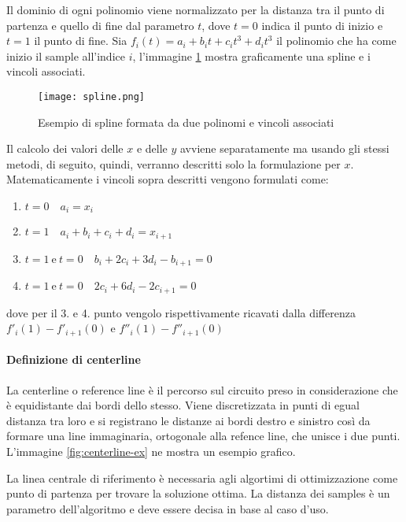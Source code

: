 Il dominio di ogni polinomio viene normalizzato per la distanza tra il punto di partenza e quello di fine
dal parametro $t$, dove $t = 0$ indica il punto di inizio e $t = 1$ il punto di fine.
Sia $f_i(t) = a_i + b_i t + c_i t^3 + d_i t^3$ il polinomio che ha come inizio il sample all'indice $i$,
l'immagine \ref{fig:spline} mostra graficamente una spline e i vincoli associati.

\begin{figure}
	\begin{center}
		\texttt{[image: spline.png]}
	\end{center}
	\caption{Esempio di spline formata da due polinomi e vincoli associati \cite{lection22}}
	\label{fig:spline}
\end{figure}

Il calcolo dei valori delle $x$ e delle $y$ avviene separatamente ma usando gli stessi metodi, di
seguito, quindi, verranno descritti solo la formulazione per $x$.
Matematicamente i vincoli sopra descritti vengono formulati come:
\begin{enumerate}
	\item $t = 0 \quad a_i = x_i$
	\item $t = 1 \quad a_i + b_i + c_i + d_i = x_{i+1}$
	\item $t = 1\ \text{e}\ t = 0 \quad b_i + 2 c_i + 3 d_i - b_{i+1} = 0$
	\item $t = 1\ \text{e}\ t = 0 \quad 2 c_i + 6 d_i - 2 c_{i+1} = 0$
\end{enumerate}
dove per il 3. e 4. punto vengolo rispettivamente ricavati dalla differenza \\
$f'_i(1) - f'_{i+1}(0)$ e $f''_i(1) - f''_{i+1}(0)$


\paragraph{Definizione di centerline}
\label{par:centerline}
La centerline o reference line è il percorso sul circuito preso in considerazione che è equidistante dai
bordi dello stesso. Viene discretizzata in punti di egual distanza tra loro e si registrano le distanze
ai bordi destro e sinistro così da formare una line immaginaria, ortogonale alla refence line, che unisce
i due punti. L'immagine \ref{fig:centerline-ex} ne mostra un esempio grafico.

La linea centrale di riferimento è necessaria agli algortimi di ottimizzazione come punto di partenza per
trovare la soluzione ottima.
La distanza dei samples è un parametro dell'algoritmo e deve essere decisa in base al caso d'uso.

